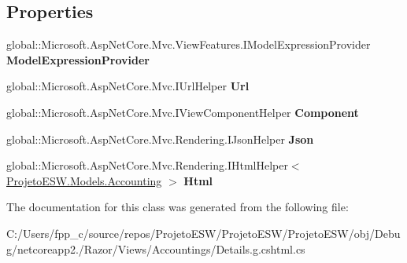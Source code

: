 \subsection*{Properties}
\begin{DoxyCompactItemize}
\item 
\mbox{\label{class_asp_net_core_1_1_views___accountings___details_a9473a1abdaa4bac65d5c0d1eae2d21df}} 
global\+::\+Microsoft.\+Asp\+Net\+Core.\+Mvc.\+View\+Features.\+I\+Model\+Expression\+Provider {\bfseries Model\+Expression\+Provider}
\item 
\mbox{\label{class_asp_net_core_1_1_views___accountings___details_a0b96995d14881ba574bce18dbf4a25f4}} 
global\+::\+Microsoft.\+Asp\+Net\+Core.\+Mvc.\+I\+Url\+Helper {\bfseries Url}
\item 
\mbox{\label{class_asp_net_core_1_1_views___accountings___details_a8c8581d152feefb86520991ffcf0f814}} 
global\+::\+Microsoft.\+Asp\+Net\+Core.\+Mvc.\+I\+View\+Component\+Helper {\bfseries Component}
\item 
\mbox{\label{class_asp_net_core_1_1_views___accountings___details_a9a74dd8496790675bbef685e222e93b1}} 
global\+::\+Microsoft.\+Asp\+Net\+Core.\+Mvc.\+Rendering.\+I\+Json\+Helper {\bfseries Json}
\item 
\mbox{\label{class_asp_net_core_1_1_views___accountings___details_ab81cbd71905b0960a4d829e453683b69}} 
global\+::\+Microsoft.\+Asp\+Net\+Core.\+Mvc.\+Rendering.\+I\+Html\+Helper$<$ \mbox{\hyperlink{class_projeto_e_s_w_1_1_models_1_1_accounting}{Projeto\+E\+S\+W.\+Models.\+Accounting}} $>$ {\bfseries Html}
\end{DoxyCompactItemize}


The documentation for this class was generated from the following file\+:\begin{DoxyCompactItemize}
\item 
C\+:/\+Users/fpp\+\_\+c/source/repos/\+Projeto\+E\+S\+W/\+Projeto\+E\+S\+W/\+Projeto\+E\+S\+W/obj/\+Debug/netcoreapp2./\+Razor/\+Views/\+Accountings/Details.\+g.\+cshtml.\+cs\end{DoxyCompactItemize}

